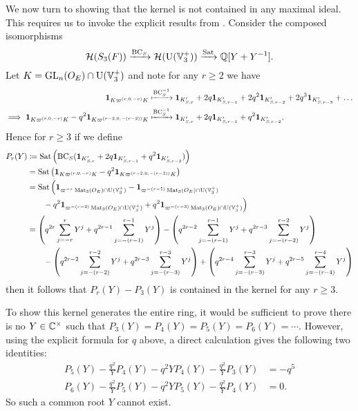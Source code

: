 We now turn to showing that the kernel is not contained in any maximal ideal.
This requires us to invoke the explicit results from .
Consider the composed isomorphisms
\[ \mathcal H(S_3(F)) \xrightarrow{\operatorname{BC}_S} \mathcal H(\operatorname{U}(\mathbb V_3^+)) \xrightarrow{\operatorname{Sat}} \mathbb Q[Y + Y^{-1}]. \]
Let $K =  \operatorname{GL}_n(O_E) \cap \operatorname{U}(\mathbb V_3^+)$ and note for any $r \ge 2$ we have
\begin{align*}
  \mathbf{1}_{K\varpi^{(r,0,-r)}K}
  &\xmapsto{\operatorname{BC}_S^{-1}}
  \mathbf{1}_{K'_{S, r}} + 2q \mathbf{1}_{K'_{S, r-1}} + 2q^2 \mathbf{1}_{K'_{S, r-2}} + 2q^3 \mathbf{1}_{K'_{S, r-3}} + \dots \\
  \implies
  \mathbf{1}_{K\varpi^{(r,0,-r)}K} - q^2 \mathbf{1}_{K\varpi^{(r-2,0,-(r-2))}K}
  &\xmapsto{\operatorname{BC}_S^{-1}}
  \mathbf{1}_{K'_{S, r}} + 2q \mathbf{1}_{K'_{S, r-1}} + q^2 \mathbf{1}_{K'_{S, r-2}}.
\end{align*}
Hence for $r \ge 3$ if we define
\begin{align*}
  P_r(Y) &\coloneqq \operatorname{Sat}\left(\operatorname{BC}_S(\mathbf{1}_{K'_{S, r}}
    + 2q \mathbf{1}_{K'_{S, r-1}} + q^2 \mathbf{1}_{K'_{S, r-2}})\right) \\
  &= \operatorname{Sat}\left( \mathbf{1}_{K\varpi^{(r,0,-r)}K} - q^2 \mathbf{1}_{K\varpi^{(r-2,0,-(r-2))}K} \right) \\
  &= \operatorname{Sat}\Big(
    \mathbf{1}_{\varpi^{-r} \operatorname{Mat}_3(O_E) \cap \operatorname{U}(\mathbb V_3^+)}
    - \mathbf{1}_{\varpi^{-(r-1)} \operatorname{Mat}_3(O_E) \cap \operatorname{U}(\mathbb V_3^+)} \\
    &\qquad- q^2 \mathbf{1}_{\varpi^{-(r-2)} \operatorname{Mat}_3(O_E) \cap \operatorname{U}(\mathbb V_3^+)}
    + q^2 \mathbf{1}_{\varpi^{-(r-3)} \operatorname{Mat}_3(O_E) \cap \operatorname{U}(\mathbb V_3^+)}
    \Big) \\
  &= \left( q^{2r} \sum_{j=-r}^r Y^j + q^{2r-1} \sum_{j=-(r-1)}^{r-1} Y^j \right)
  - \left( q^{2r-2} \sum_{j=-(r-1)}^{r-1} Y^j + q^{2r-3} \sum_{j=-(r-2)}^{r-2} Y^j \right) \\
  &\qquad- \left( q^{2r-2} \sum_{j=-(r-2)}^{r-2} Y^j + q^{2r-3} \sum_{j=-(r-3)}^{r-3} Y^j \right)
  + \left( q^{2r-4} \sum_{j=-(r-3)}^{r-3} Y^j + q^{2r-5} \sum_{j=-(r-4)}^{r-4} Y^j \right)
\end{align*}
then it follows that $P_r(Y) - P_3(Y)$ is contained in the kernel for any $r \ge 3$.

To show this kernel generates the entire ring, it would be sufficient to prove
there is no $Y \in \mathbb C^\times$ such that $P_3(Y) = P_4(Y) = P_5(Y) = P_6(Y) = \dotsb$.
However, using the explicit formula for $q$ above,
a direct calculation gives the following two identities:
\begin{align*}
  P_5(Y) - \frac{q^2}{Y} P_4(Y) - q^2 Y P_4(Y) - \frac{q^2}{Y} P_3(Y) &= -q^5 \\
  P_6(Y) - \frac{q^2}{Y} P_5(Y) - q^2 Y P_5(Y) - \frac{q^2}{Y} P_4(Y) &= 0.
\end{align*}
So such a common root $Y$ cannot exist.

